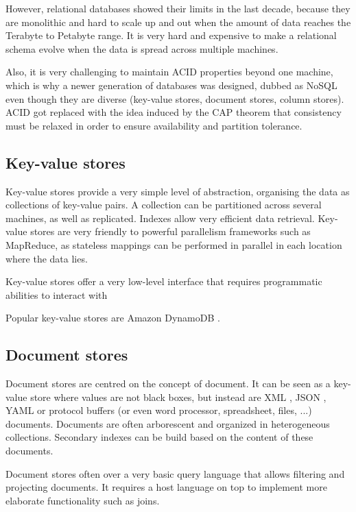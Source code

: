 \documentclass{acm_proc_article-sp}
\begin{document}
However, relational databases showed their limits in the last decade, because they are monolithic and hard to scale up and out when the amount of data reaches the Terabyte to Petabyte range. It is very hard and expensive to make a relational schema evolve when the data is spread across multiple machines.

Also, it is very challenging to maintain ACID properties \cite{Haerder1983} beyond one machine, which is why a newer generation of databases was designed, dubbed as NoSQL even though they are diverse (key-value stores, document stores, column stores). ACID got replaced with the idea induced by the CAP theorem \cite{Gilbert2002} that consistency must be relaxed in order to ensure availability and partition tolerance.

\subsection{Key-value stores}

Key-value stores provide a very simple level of abstraction, organising the data as collections of key-value pairs. A collection can be partitioned across several machines, as well as replicated. Indexes allow very efficient data retrieval. Key-value stores are very friendly to powerful parallelism frameworks such as MapReduce, as stateless mappings can be performed in parallel in each location where the data lies.

Key-value stores offer a very low-level interface that requires programmatic abilities to interact with

Popular key-value stores are Amazon DynamoDB \cite{DeCandia2007}.

\subsection{Document stores}

Document stores are centred on the concept of document. It can be seen as a key-value store where values are not black boxes, but instead are XML \cite{XML}, JSON \cite{JSON}, YAML \cite{YAML} or protocol buffers \cite{ProtocolBuffers} (or even word processor, spreadsheet, files, ...) documents. Documents are often arborescent and organized in heterogeneous collections. Secondary indexes can be build based on the content of these documents.

Document stores often over a very basic query language that allows filtering and projecting documents. It requires a host language on top to implement more elaborate functionality such as joins. 
\end{document}
